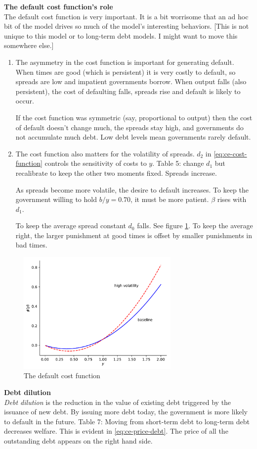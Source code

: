 \documentclass[11pt, pdftex]{article}
\begin{document}
\textbf{The default cost function's role}\\
The default cost function is very important. It is a bit worrisome that an ad hoc bit of the model drives so much of the model's interesting behaviors. [This is not unique to this model or to long-term debt models. I might want to move this somewhere else.]
\begin{enumerate}
  \item The asymmetry in the cost function is important for generating default. When times are good (which is persistent) it is very costly to default, so spreads are low and impatient governments borrow. When output falls (also persistent), the cost of defaulting falls, spreads rise and default is likely to occur.

      If the cost function was symmetric (say, proportional to output) then the cost of default doesn't change much, the spreads stay high, and governments do not accumulate much debt. Low debt levels mean governments rarely default.

  \item The cost function also matters for the volatility of spreads. $d_2$ in \eqref{eq:ce-cost-function} controls the sensitivity of costs to $y$. Table 5: change $d_1$ but recalibrate to keep the other two moments fixed. Spreads increase.

      As spreads become more volatile, the desire to default increases. To keep the government willing to hold $b/y=0.70$, it must be more patient. $\beta$ rises with $d_1$.

      To keep the average spread constant $d_0$ falls. See figure \ref{fig:ce-default-cost}. To keep the average right, the larger punishment at good times is offset by smaller punishments in bad times.
\end{enumerate}
\begin{figure}
  \centering
  \includegraphics[width=0.7\textwidth]{figures/phi.pdf}
  \caption{The default cost function}\label{fig:ce-default-cost}
\end{figure}
\textbf{Debt dilution}\\
\textit{Debt dilution} is the reduction in the value of existing debt triggered by the issuance of new debt. By issuing more debt today, the government is more likely to default in the future. Table 7: Moving from short-term debt to long-term debt decreases welfare. This is evident in \eqref{eq:ce-price-debt}. The price of all the outstanding debt appears on the right hand side.
\end{document}
